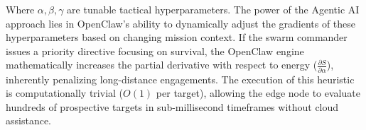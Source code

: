Where $\alpha, \beta, \gamma$ are tunable tactical hyperparameters. The power of the Agentic AI approach lies in OpenClaw's ability to dynamically adjust the gradients of these hyperparameters based on changing mission context. If the swarm commander issues a priority directive focusing on survival, the OpenClaw engine mathematically increases the partial derivative with respect to energy ($\frac{\partial S}{\partial \alpha}$), inherently penalizing long-distance engagements. The execution of this heuristic is computationally trivial ($O(1)$ per target), allowing the edge node to evaluate hundreds of prospective targets in sub-millisecond timeframes without cloud assistance.
